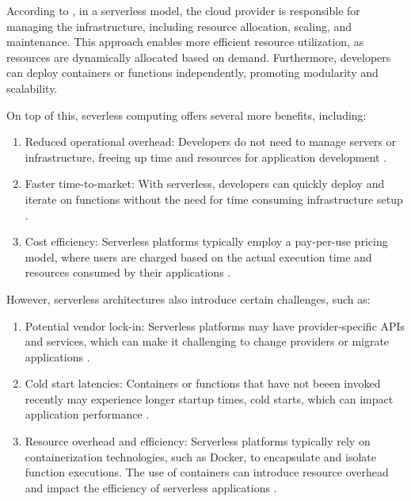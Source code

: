 \documentclass[
  table]{report}
\providecommand{\tightlist}{%
  \setlength{\itemsep}{0pt}\setlength{\parskip}{0pt}}
\begin{document}
According to \citet{baldiniServerlessComputingCurrent2017}, in a
serverless model, the cloud provider is responsible for managing the
infrastructure, including resource allocation, scaling, and maintenance.
This approach enables more efficient resource utilization, as resources
are dynamically allocated based on demand. Furthermore, developers can
deploy containers or functions independently, promoting modularity and
scalability.

On top of this, severless computing offers several more benefits,
including:

\begin{enumerate}
\def\labelenumi{\arabic{enumi}.}
\tightlist
\item
  Reduced operational overhead: Developers do not need to manage servers
  or infrastructure, freeing up time and resources for application
  development \citep{baldiniServerlessComputingCurrent2017}.
\item
  Faster time-to-market: With serverless, developers can quickly deploy
  and iterate on functions without the need for time consuming
  infrastructure setup \citep{adzicServerlessComputingEconomic2017}.
\item
  Cost efficiency: Serverless platforms typically employ a pay-per-use
  pricing model, where users are charged based on the actual execution
  time and resources consumed by their applications
  \citep{eismannReviewServerlessUse2021}.
\end{enumerate}

However, serverless architectures also introduce certain challenges,
such as:

\begin{enumerate}
\def\labelenumi{\arabic{enumi}.}
\tightlist
\item
  Potential vendor lock-in: Serverless platforms may have
  provider-specific APIs and services, which can make it challenging to
  change providers or migrate applications
  \citep{gottliebServerlessDataLockin2018}.
\item
  Cold start latencies: Containers or functions that have not beeen
  invoked recently may experience longer startup times, cold starts,
  which can impact application performance
  \citep{golecColdStartLatency2023}.
\item
  Resource overhead and efficiency: Serverless platforms typically rely
  on containerization technologies, such as Docker, to encapsulate and
  isolate function executions. The use of containers can introduce
  resource overhead and impact the efficiency of serverless applications
  \citep{akkusSANDHighPerformanceServerless2018}.
\end{enumerate}
\end{document}
